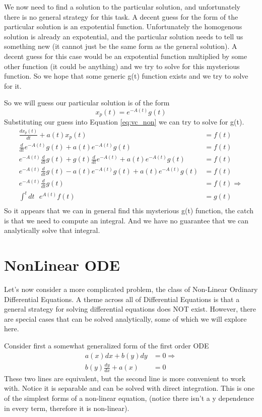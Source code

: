 \documentclass{article}
\newcommand{\be}{\begin{equation}}
\newcommand{\ee}{\end{equation}}
\begin{document}
We now need to find a solution to the particular solution, and unfortunately there is no general strategy for this task.
A decent guess for the form of the particular solution is an expotential function. 
Unfortunately the homogenous solution is already an expotential, and the particular solution needs to tell us something new (it cannot just be the same form as the general solution). 
A decent guess for this case would be an expotential function multiplied by some other function (it could be anything) and we try to solve for this mysterious function.
So we hope that some generic g(t) function exists and we try to solve for it.

So we will guess our particular solution is of the form
\be
x_p(t) = e^{-A(t)}g(t)
\ee
Substituting our guess into Equation \ref{eq:vc_non} we can try to solve for g(t).
\be
\begin{split}
    \frac{dx_p(t)}{dt} + a(t) x_p(t) &= f(t) \\
    \frac{d}{dt} e^{-A(t)}g(t) + a(t)  e^{-A(t)}g(t) &= f(t)\\
    e^{-A(t)} \frac{d}{dt} g(t) + g(t) \frac{d}{dt} e^{-A(t)} + a(t)  e^{-A(t)}g(t) &= f(t)\\
    e^{-A(t)} \frac{d}{dt} g(t) -a(t) e^{-A(t)} g(t) + a(t)  e^{-A(t)}g(t) &= f(t)\\
    e^{-A(t)} \frac{d}{dt} g(t) &= f(t) \Rightarrow \\
    \int^t dt \text{ }e^{A(t)} f(t) &= g(t) \\
\end{split}
\ee
So it appears that we can in general find this mysterious g(t) function, the catch is that we need to compute an integral. 
And we have no guarantee that we can analytically solve that integral. 

\section*{NonLinear ODE}
Let's now consider a more complicated problem, the class of Non-Linear Ordinary Differential Equations.
A theme across all of Differential Equations is that a general strategy for solving differential equations does NOT exist. 
However, there are special cases that can be solved analytically, some of which we will explore here. 

Consider first a somewhat generalized form of the first order ODE
\be
\begin{split}
    a(x) dx + b(y) dy &= 0 \Rightarrow\\
    b(y) \frac{dy}{dx} + a(x) &= 0
\end{split}
\ee
These two lines are equivalent, but the second line is more convenient to work with.
Notice it is separable and can be solved with direct integration.
This is one of the simplest forms of a non-linear equation, (notice there isn't a y dependence in every term, therefore it is non-linear). 
\end{document}
